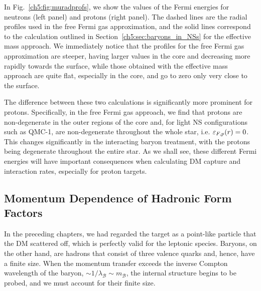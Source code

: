 In Fig.~\ref{ch5:fig:muradprofs}, we show the values of the Fermi energies for neutrons (left panel) and protons (right panel). The dashed lines are the radial profiles used in the free Fermi gas approximation, and the solid lines correspond to the calculation outlined in Section~\ref{ch5:sec:baryons_in_NSs} for the effective mass approach. We immediately notice that the profiles for the free Fermi gas approximation are steeper, having larger values in the core and decreasing more rapidly towards the surface, while those obtained with the effective mass approach are quite flat, especially in the core, and go to zero only very close to the surface.

The difference between these two calculations is significantly more prominent for protons. Specifically, in the free Fermi gas approach, we find that protons are non-degenerate in the outer regions of the core and, for light NS configurations such as QMC-1, are non-degenerate throughout the whole star, i.e. $\varepsilon_{F,p}(r) = 0$.
This changes significantly in the interacting baryon treatment, with the protons being degenerate throughout the entire star.
As we shall see, these different Fermi energies will have important consequences when calculating DM capture and interaction rates, especially for proton targets.


\subsection{Momentum Dependence of Hadronic Form Factors}
\label{ch5:subsec:mom_dep_FF}

In the preceding chapters, we had regarded the target as a point-like particle that the DM scattered off, which is perfectly valid for the leptonic species. Baryons, on the other hand, are hadrons that consist of three valence quarks and, hence, have a finite size. When the momentum transfer exceeds the inverse Compton wavelength of the baryon, $\sim 1/\lambda_\mathcal{B} \sim m_\mathcal{B}$, the internal structure begins to be probed, and we must account for their finite size.

